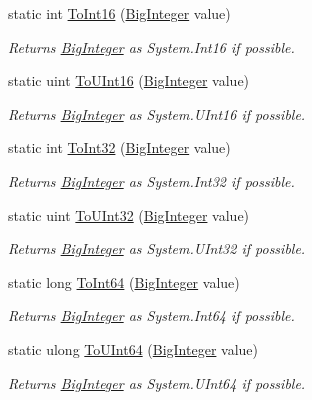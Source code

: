\begin{DoxyCompactItemize}
static int \hyperlink{class_scott_garland_1_1_big_integer_a282c756614e3530c7ca3db75122df382}{To\+Int16} (\hyperlink{class_scott_garland_1_1_big_integer}{Big\+Integer} value)
\begin{DoxyCompactList}\small\item\em Returns \hyperlink{class_scott_garland_1_1_big_integer}{Big\+Integer} as System.\+Int16 if possible. \end{DoxyCompactList}\item 
static uint \hyperlink{class_scott_garland_1_1_big_integer_a2a619b20c5463022dd1f6d21b3816a22}{To\+U\+Int16} (\hyperlink{class_scott_garland_1_1_big_integer}{Big\+Integer} value)
\begin{DoxyCompactList}\small\item\em Returns \hyperlink{class_scott_garland_1_1_big_integer}{Big\+Integer} as System.\+U\+Int16 if possible. \end{DoxyCompactList}\item 
static int \hyperlink{class_scott_garland_1_1_big_integer_ae3db4ced22f3c869e6093fe0dc3f7b73}{To\+Int32} (\hyperlink{class_scott_garland_1_1_big_integer}{Big\+Integer} value)
\begin{DoxyCompactList}\small\item\em Returns \hyperlink{class_scott_garland_1_1_big_integer}{Big\+Integer} as System.\+Int32 if possible. \end{DoxyCompactList}\item 
static uint \hyperlink{class_scott_garland_1_1_big_integer_a89c18ca36b64bb368c7e96906a750537}{To\+U\+Int32} (\hyperlink{class_scott_garland_1_1_big_integer}{Big\+Integer} value)
\begin{DoxyCompactList}\small\item\em Returns \hyperlink{class_scott_garland_1_1_big_integer}{Big\+Integer} as System.\+U\+Int32 if possible. \end{DoxyCompactList}\item 
static long \hyperlink{class_scott_garland_1_1_big_integer_ae0fc996dd71a2fb206e03230c1534a6a}{To\+Int64} (\hyperlink{class_scott_garland_1_1_big_integer}{Big\+Integer} value)
\begin{DoxyCompactList}\small\item\em Returns \hyperlink{class_scott_garland_1_1_big_integer}{Big\+Integer} as System.\+Int64 if possible. \end{DoxyCompactList}\item 
static ulong \hyperlink{class_scott_garland_1_1_big_integer_a5b75b559d0c7ec75ff4eaceb1cdee2a4}{To\+U\+Int64} (\hyperlink{class_scott_garland_1_1_big_integer}{Big\+Integer} value)
\begin{DoxyCompactList}\small\item\em Returns \hyperlink{class_scott_garland_1_1_big_integer}{Big\+Integer} as System.\+U\+Int64 if possible. \end{DoxyCompactList}\end{DoxyCompactItemize}

